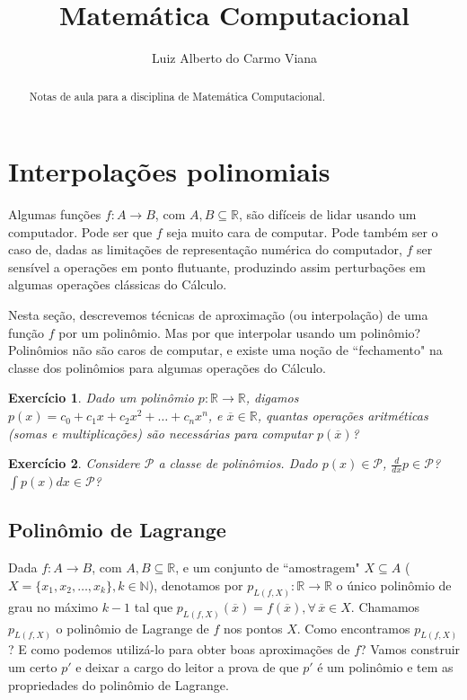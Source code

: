\documentclass[]{article}
\title{Matemática Computacional}
\author{Luiz Alberto do Carmo Viana}
\newtheorem{exercicio}{Exercício}
\numberwithin{equation}{section}
\begin{document}
\maketitle

\begin{abstract}
Notas de aula para a disciplina de Matemática Computacional.
\end{abstract}

\tableofcontents

\pagebreak

\section{Interpolações polinomiais}

Algumas funções $f : A \to B$, com $A, B \subseteq \mathbb{R}$, são
difíceis de lidar usando um computador. Pode ser que $f$ seja muito
cara de computar. Pode também ser o caso de, dadas as limitações de
representação numérica do computador, $f$ ser sensível a operações em
ponto flutuante, produzindo assim perturbações em algumas operações
clássicas do Cálculo.

Nesta seção, descrevemos técnicas de aproximação (ou interpolação) de
uma função $f$ por um polinômio. Mas por que interpolar usando um
polinômio? Polinômios não são caros de computar, e existe uma noção de
``fechamento" na classe dos polinômios para algumas operações do
Cálculo.

\begin{exercicio}
  Dado um polinômio $p : \mathbb{R} \to \mathbb{R}$, digamos
  $p(x) = c_0 + c_1x + c_2x^2 + \dots + c_nx^n$, e
  $\overline{x} \in \mathbb{R}$, quantas operações aritméticas (somas
  e multiplicações) são necessárias para computar $p(\overline{x})$?
\end{exercicio}

\begin{exercicio}
  Considere $\mathcal{P}$ a classe de polinômios. Dado
  $p(x) \in \mathcal{P}$, $\frac{d}{dx} p \in \mathcal{P}$?
  $\int p(x)dx \in \mathcal{P}$?
\end{exercicio}

\subsection{Polinômio de Lagrange}

Dada $f : A \to B$, com $A, B \subseteq \mathbb{R}$, e um conjunto de
``amostragem" $X \subseteq A$
($X = \{x_1, x_2, \dots, x_k\}, k \in \mathbb{N}$), denotamos por
$p_{L(f, X)} : \mathbb{R} \to \mathbb{R}$ o único polinômio de grau no
máximo $k - 1$ tal que
$p_{L(f, X)}(\overline{x}) = f(\overline{x}), \forall\, \overline{x}
\in X$. Chamamos $p_{L(f, X)}$ o polinômio de Lagrange de $f$ nos
pontos $X$. Como encontramos $p_{L(f, X)}$? E como podemos utilizá-lo
para obter boas aproximações de $f$?  Vamos construir um certo $p'$ e
deixar a cargo do leitor a prova de que $p'$ é um polinômio e tem as
propriedades do polinômio de Lagrange.
\end{document}
